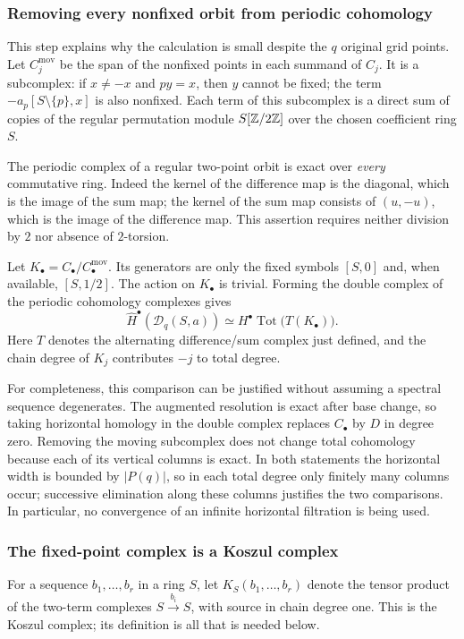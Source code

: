 \subsubsection{Removing every nonfixed orbit from periodic cohomology}
This step explains why the calculation is small despite the $q$
original grid points. Let $C^{\mathrm{mov}}_j$ be the span of the
nonfixed points in each summand of $C_j$. It is a subcomplex:
if $x\ne-x$ and $py=x$, then $y$ cannot be fixed; the term
$-a_p[S\setminus\{p\},x]$ is also nonfixed. Each term of this
subcomplex is a direct sum of copies of the regular permutation
module $S[\mathbb{Z}/2\mathbb{Z}]$ over the chosen coefficient ring $S$.

The periodic complex of a regular two-point orbit is exact over
\emph{every} commutative ring. Indeed the kernel of the difference
map is the diagonal, which is the image of the sum map; the kernel
of the sum map consists of $(u,-u)$, which is the image of the
difference map. This assertion requires neither division by $2$
nor absence of $2$-torsion.

Let $K_\bullet=C_\bullet/C^{\mathrm{mov}}_\bullet$. Its generators
are only the fixed symbols $[S,0]$ and, when available, $[S,1/2]$.
The action on $K_\bullet$ is trivial. Forming the double complex of
the periodic cohomology complexes gives
\begin{equation}\label{ir:eq:tate-comparison}
 \widehat H^\bullet(\mathcal D_q(S,a))\simeq
 H^\bullet\operatorname{Tot}\bigl(T(K_\bullet)\bigr).
\end{equation}
Here $T$ denotes the alternating difference/sum complex just defined,
and the chain degree of $K_j$ contributes $-j$ to total degree.

For completeness, this comparison can be justified without assuming a
spectral sequence degenerates. The augmented resolution is exact after
base change, so taking horizontal homology in the double complex
replaces $C_\bullet$ by $D$ in degree zero. Removing the moving
subcomplex does not change total cohomology because each of its
vertical columns is exact. In both statements the horizontal width
is bounded by $|P(q)|$, so in each total degree only finitely many
columns occur; successive elimination along these columns justifies
the two comparisons. In particular, no convergence of an infinite
horizontal filtration is being used.

\subsubsection{The fixed-point complex is a Koszul complex}
For a sequence $b_1,\ldots,b_r$ in a ring $S$, let
$K_S(b_1,\ldots,b_r)$ denote the tensor product of the two-term
complexes $S\xrightarrow{b_i}S$, with source in chain degree one.
This is the Koszul complex; its definition is all that is needed below.


